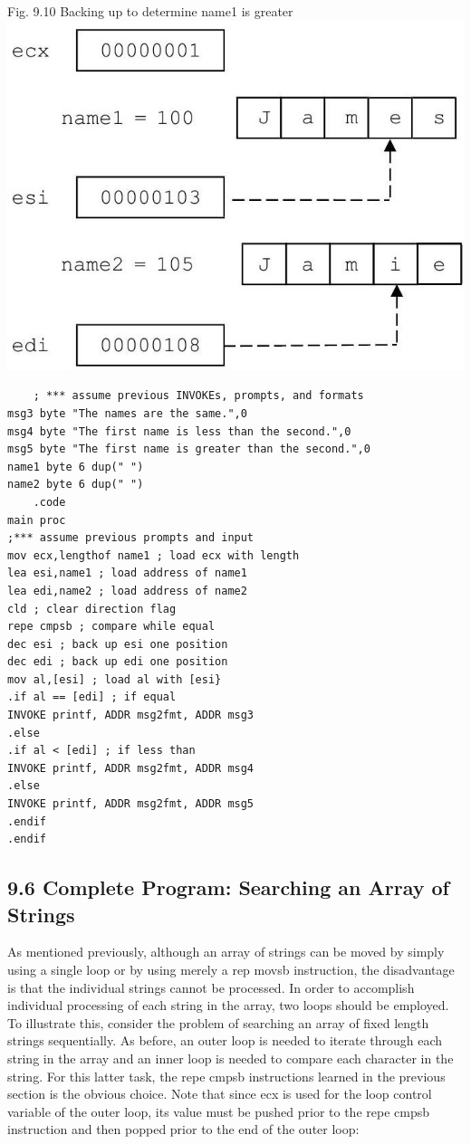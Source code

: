 \documentclass[10pt]{article}
\begin{document}
Fig. 9.10 Backing up to determine name1 is greater\\
\includegraphics[max width=\textwidth, center]{2025_03_24_ebe50cc223a6fbc49eecg-214}

\begin{verbatim}
    ; *** assume previous INVOKEs, prompts, and formats
msg3 byte "The names are the same.",0
msg4 byte "The first name is less than the second.",0
msg5 byte "The first name is greater than the second.",0
name1 byte 6 dup(" ")
name2 byte 6 dup(" ")
    .code
main proc
;*** assume previous prompts and input
mov ecx,lengthof name1 ; load ecx with length
lea esi,name1 ; load address of name1
lea edi,name2 ; load address of name2
cld ; clear direction flag
repe cmpsb ; compare while equal
dec esi ; back up esi one position
dec edi ; back up edi one position
mov al,[esi] ; load al with [esi}
.if al == [edi] ; if equal
INVOKE printf, ADDR msg2fmt, ADDR msg3
.else
.if al < [edi] ; if less than
INVOKE printf, ADDR msg2fmt, ADDR msg4
.else
INVOKE printf, ADDR msg2fmt, ADDR msg5
.endif
.endif
\end{verbatim}

\subsection*{9.6 Complete Program: Searching an Array of Strings}
As mentioned previously, although an array of strings can be moved by simply using a single loop or by using merely a rep movsb instruction, the disadvantage is that the individual strings cannot be processed. In order to accomplish individual processing of each string in the array, two loops should be employed. To illustrate this, consider the problem of searching an array of fixed length strings sequentially. As before, an outer loop is needed to iterate through each string in the array and an inner loop is needed to compare each character in the string. For this latter task, the repe cmpsb instructions learned in the previous section is the obvious choice. Note that since ecx is used for the loop control variable of the outer loop, its value must be pushed prior to the repe cmpsb instruction and then popped prior to the end of the outer loop:
\end{document}
